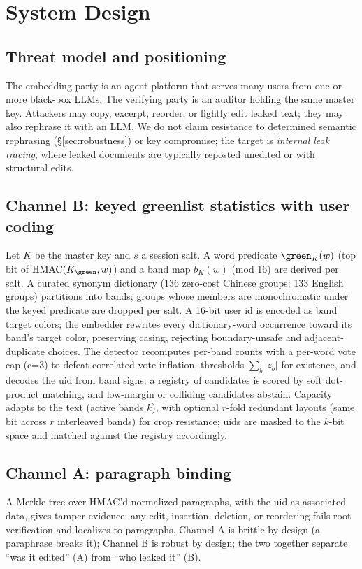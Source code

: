 \section{System Design}
\label{sec:design}

\subsection{Threat model and positioning}
The embedding party is an agent platform that serves many users from one
or more black-box LLMs. The verifying party is an auditor holding the same
master key. Attackers may copy, excerpt, reorder, or lightly edit leaked
text; they may also rephrase it with an LLM. We do not claim resistance to
determined semantic rephrasing (\S\ref{sec:robustness}) or key compromise;
the target is \emph{internal leak tracing}, where leaked documents are
typically reposted unedited or with structural edits.

\subsection{Channel B: keyed greenlist statistics with user coding}
Let $K$ be the master key and $s$ a session salt. A word predicate
$\green_K(w)$ (top bit of $\mathrm{HMAC}(K_{\green}, w)$) and a band map
$b_K(w)$ (mod 16) are derived per salt. A curated synonym dictionary
(136 zero-cost Chinese groups; 133 English groups) partitions into bands;
groups whose members are monochromatic under the keyed predicate are
dropped per salt. A 16-bit user id is encoded as band target colors; the
embedder rewrites every dictionary-word occurrence toward its band's target
color, preserving casing, rejecting boundary-unsafe and adjacent-duplicate
choices. The detector recomputes per-band counts with a per-word vote cap
(c=3) to defeat correlated-vote inflation, thresholds $\sum_b |z_b|$ for
existence, and decodes the uid from band signs; a registry of candidates is
scored by soft dot-product matching, and low-margin or colliding candidates
abstain. Capacity adapts to the text (active bands $k$), with optional
$r$-fold redundant layouts (same bit across $r$ interleaved bands) for
crop resistance; uids are masked to the $k$-bit space and matched against
the registry accordingly.

\subsection{Channel A: paragraph binding}
A Merkle tree over HMAC'd normalized paragraphs, with the uid as associated
data, gives tamper evidence: any edit, insertion, deletion, or reordering
fails root verification and localizes to paragraphs. Channel A is brittle
by design (a paraphrase breaks it); Channel B is robust by design; the two
together separate ``was it edited'' (A) from ``who leaked it'' (B).

